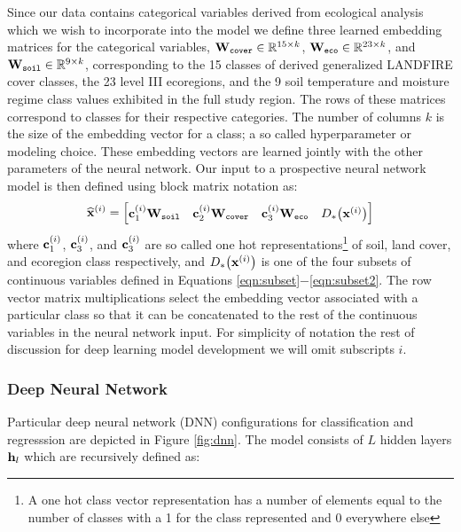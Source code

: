\def\year{2017}\relax \documentclass[letterpaper]{article}
\begin{document}
Since our data contains categorical variables derived from ecological analysis which we wish to incorporate into the model we define three learned embedding matrices for the categorical variables, ${\bf W}_{\texttt{cover}}\in \mathbb{R}^{15 \times k}$, ${\bf W}_{\texttt{eco}}\in \mathbb{R}^{23 \times k}$, and ${\bf W}_{\texttt{soil}}\in \mathbb{R}^{9 \times k}$, corresponding to the 15 classes of derived generalized LANDFIRE cover classes, the 23 level III ecoregions, and the 9 soil temperature and moisture regime class values exhibited in the full study region. The rows of these matrices correspond to classes for their respective categories. The number of columns $k$ is the size of the embedding vector for a class; a so called hyperparameter or modeling choice. These embedding vectors are learned jointly with the other parameters of the neural network. Our input to a prospective neural network model is then defined using block matrix notation as:
\begin{equation}
\widehat{{\bf x}}^{(i)} = \begin{bmatrix}{\bf c}_1^{(i)}{\bf W}_{\texttt{soil}}&{\bf c}_2^{(i)}{\bf W}_{\texttt{cover}}&{\bf c}_3^{(i)}{\bf W}_{\texttt{eco}}&D_*\bigl({\bf x}^{(i)}\bigr)\end{bmatrix}
\end{equation}
where ${\bf c}_1^{(i)}$, ${\bf c}_3^{(i)}$, and ${\bf c}_3^{(i)}$ are so called one hot representations\footnote{A one hot class vector representation has a number of elements equal to the number of classes with a 1 for the class represented and 0 everywhere else} of soil, land cover, and ecoregion class respectively, and $D_*\bigl({\bf x}^{(i)}\bigr)$ is one of the four subsets of continuous variables defined in Equations \ref{eqn:subset}$-$\ref{eqn:subset2}. The row vector matrix multiplications select the embedding vector associated with a particular class so that it can be concatenated to the rest of the continuous variables in the neural network input. For simplicity of notation the rest of discussion for deep learning model development we will omit subscripts $i$.
\subsubsection{Deep Neural Network}\label{dnn}
Particular deep neural network (DNN) configurations for classification and regresssion are depicted in Figure \ref{fig:dnn}. The model consists of $L$ hidden layers ${\bf h}_l$ which are recursively defined as:
\end{document}
